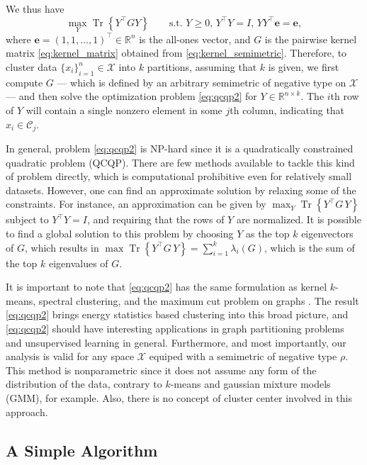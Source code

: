 \documentclass{article}
\DeclareMathOperator{\Tr}{Tr}
\newcommand\C{{\mathcal{C}}}
\newcommand\Zt{Y}
\begin{document}
We thus have
\begin{equation}
\label{eq:qcqp2}
\max_{\Zt} \Tr \left\{ \Zt^\top G \Zt \right\}  \qquad
\mbox{s.t. $\Zt \ge 0$, $\Zt^\top \Zt = I$, 
$\Zt \Zt^\top \bm{e} = \bm{e}$},
\end{equation}
where $\bm{e} = (1,1,\dots,1)^\top \in \mathbb{R}^n$ is the all-ones vector,
and $G$ is the pairwise kernel matrix \eqref{eq:kernel_matrix} obtained
from \eqref{eq:kernel_semimetric}.
Therefore, to cluster data $\{ x_i \}_{i=1}^n \in \mathcal{X}$ into 
$k$ partitions,
assuming that $k$ is given, we first compute $G$  --- 
which is  defined by an arbitrary semimetric of negative 
type on $\mathcal{X}$  --- and then 
solve the optimization problem \eqref{eq:qcqp2} for $\Zt \in
\mathbb{R}^{n\times k}$. The $i$th row
of $\Zt$ will contain a single nonzero element in some $j$th column,
indicating that $x_i \in \C_j$.

In general, 
problem \eqref{eq:qcqp2} is NP-hard since it is a quadratically
constrained quadratic problem (QCQP). There are  
few methods available to tackle this kind of problem directly,
which is computational prohibitive even for relatively small datasets.
However, one can find an approximate solution by relaxing some 
of the constraints. For instance, an approximation can be given
by 
$\max_{Y} \Tr\left\{ Y^\top G \, Y \right\}$ subject to $Y^\top Y = I$,
and requiring that the rows of $Y$ are normalized. 
It is possible to find a global solution to this problem by
choosing $Y$ as the top $k$ eigenvectors of $G$, which results
in 
$\max \Tr \left\{ Y^\top G \, Y \right\}  = \sum_{i=1}^k \lambda_i(G)$, 
which is the
sum of the top $k$ eigenvalues of $G$.

It is important to note that \eqref{eq:qcqp2} has the same
formulation as kernel $k$-means, spectral clustering, and the maximum
cut problem on graphs \cite{Dhillon}. The 
result \eqref{eq:qcqp2} brings energy statistics based clustering
into this broad picture, and \eqref{eq:qcqp2} should have 
interesting applications in
graph partitioning problems and unsupervised learning in general. 
Furthermore, and most importantly, our analysis is valid
for any space $\mathcal{X}$ equiped with a semimetric of negative type $\rho$.
This method is
nonparametric since it does not assume any form of the 
distribution of the data,
contrary to $k$-means and gaussian mixture models (GMM), for example.
Also, there is no concept of cluster center involved in this approach.


\subsection{A Simple Algorithm}
\end{document}
